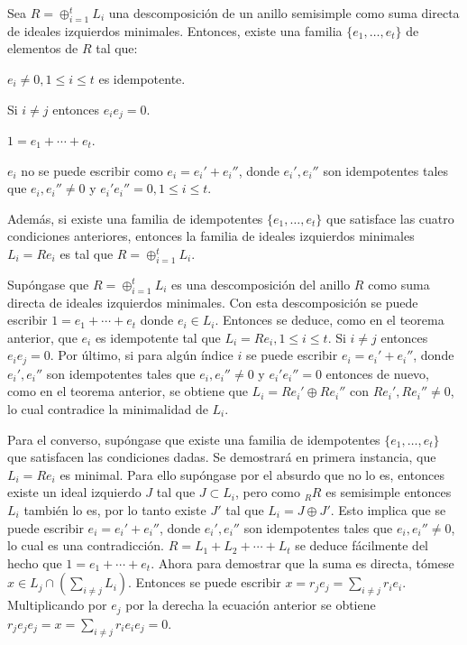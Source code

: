 \begin{teorema}\label{teo:familiaIdempotentes}
Sea $R = \oplus_{i = 1}^t L_i$ una descomposición de un anillo semisimple como suma directa de ideales izquierdos minimales. Entonces, existe una familia $\{e_1, \dots, e_t \}$ de elementos de $R$ tal que:
\begin{bulletList}
\item\label{item:orto1} $e_i \neq 0, 1 \leq i \leq t$ es idempotente.
\item\label{item:orto2} Si $i \neq j$ entonces $e_ie_j = 0$.
\item\label{item:orto3}$1 = e_1 + \cdots + e_t$.
\item\label{item:orto4} $e_i$ no se puede escribir como $e_i = e_i'+ e_i''$, donde $e_i', e_i''$ son idempotentes tales que $e_i, e_i'' \neq 0$ y $e_i'e_i''=0, 1\leq i \leq t$.
\end{bulletList}

Además, si existe una familia de idempotentes $\{e_1, \dots, e_t \}$ que satisface las cuatro condiciones anteriores, entonces la familia de ideales izquierdos minimales $L_i = Re_i$ es tal que $R = \oplus_{i=1}^tL_i$.
\end{teorema}
\begin{proof*}
Supóngase que $R = \oplus_{i = 1}^tL_i$ es una descomposición del anillo $R$ como suma directa de ideales izquierdos minimales. Con esta descomposición se puede escribir $1 = e_1 + \cdots + e_t$ donde $e_i \in L_i$. Entonces se deduce, como en el teorema anterior, que $e_i$ es idempotente tal que $L_i = Re_i, 1 \leq i \leq t$. Si $i \neq j$ entonces $e_ie_j = 0$. Por último, si para algún índice $i$ se puede escribir $e_i = e_i'+ e_i''$, donde $e_i', e_i''$ son idempotentes tales que $e_i, e_i'' \neq 0$ y $e_i'e_i''=0$ entonces de nuevo, como en el teorema anterior, se obtiene que $L_i = Re_i'\oplus Re_i''$ con $Re_i', Re_i'' \neq 0$, lo cual contradice la minimalidad de $L_i$. 

Para el converso, supóngase que existe una familia de idempotentes $\{ e_1, \dots, e_t \}$ que satisfacen las condiciones dadas. Se demostrará en primera instancia, que $L_i = Re_i$ es minimal. Para ello supóngase por el absurdo que no lo es, entonces existe un ideal izquierdo $J$ tal que $J \subset L_i$, pero como $_RR$ es semisimple entonces $L_i$ también lo es, por lo tanto existe $J'$ tal que $L_i = J\oplus J'$. Esto implica que se puede escribir $e_i = e_i'+ e_i''$, donde $e_i', e_i''$ son idempotentes tales que $e_i, e_i'' \neq 0$, lo cual es una contradicción.
$R = L_1 + L_2 + \cdots + L_t$ se deduce fácilmente del hecho que $1 = e_1 + \cdots + e_t$. Ahora para demostrar que la suma es directa, tómese $x \in L_j \cap \left( \sum_{i \neq j}L_i \right)$. Entonces se puede escribir $x = r_je_j = \sum_{i \neq j}r_ie_i$. Multiplicando por $e_j$ por la derecha la ecuación anterior se obtiene $r_je_je_j = x = \sum_{i \neq j}r_ie_ie_j = 0$.
\end{proof*}

